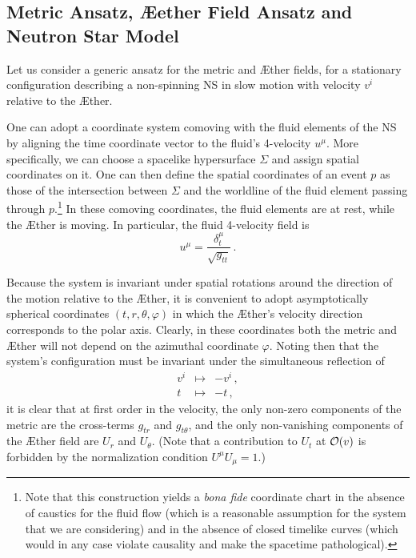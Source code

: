 \documentclass[prd,aps,twocolumn,nofootinbib,showpacs,superscriptaddress]{revtex4-1}
\newcommand\be{\begin{equation}}
\newcommand\ba{\begin{eqnarray}}
\newcommand\ee{\end{equation}}
\newcommand\ea{\end{eqnarray}}
\begin{document}
\subsection{Metric Ansatz, \AE ether Field Ansatz and Neutron Star Model}
\label{subsec:ansatz-AE}

Let us consider a generic ansatz for the metric and \AE ther fields, for a
stationary configuration describing a non-spinning NS
in slow motion with velocity $v^i$ relative to the \AE ther.

One can adopt a coordinate system comoving
with the fluid elements of the NS by aligning the time coordinate vector to the fluid's 4-velocity $u^\mu$.
More specifically, we can choose a spacelike hypersurface $\Sigma$ and assign spatial
coordinates on it. One can then define the spatial coordinates of an event $p$ as
those of the intersection between $\Sigma$ and the worldline of the fluid element passing through $p$.\footnote{Note that
this construction yields a \textit{bona fide} coordinate chart in the absence of caustics for the fluid flow (which is a reasonable assumption for the system that we are considering)
and in the absence of closed timelike curves (which would in any case violate causality and make the spacetime pathological).}
In these comoving coordinates,  the fluid elements are at rest, while the \AE ther is moving. In particular, the fluid 4-velocity field is
\be 
u^\mu = \frac{\delta^\mu_t}{\sqrt{g_{tt}}}\,.
\label{4-velocity0}
\ee

Because the system is invariant under spatial rotations around the direction of
the motion relative to the \AE ther, it is convenient to adopt 
asymptotically spherical coordinates $(t,r,\theta,\varphi)$ in which the \AE ther's velocity
direction corresponds to the polar axis. Clearly, in these coordinates
both the metric and \AE ther will not depend on the azimuthal coordinate $\varphi$. 
Noting then that the system's configuration must be invariant
under the simultaneous reflection of 
%
\ba
\label{reflection-v}
v^i &\mapsto & -v^i\,, \\
\label{reflection-t}
t &\mapsto & -t\,, \ea
it is clear that at first order in the velocity,
the only non-zero components of the metric are the cross-terms
$g_{t r}$ and $g_{t \theta}$, and the only non-vanishing components of the \AE ther field are
$U_r$ and $U_\theta$. (Note that a contribution to $U_t$ at ${\cal O} (v)$ is forbidden
by the normalization condition $U^\mu U_\mu=1$.)
\end{document}
